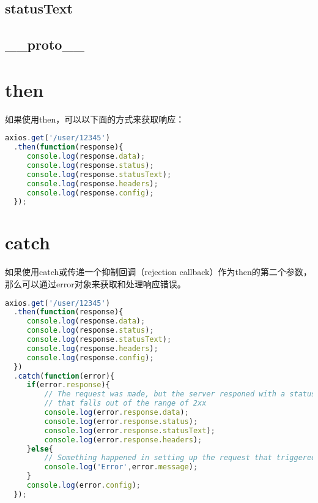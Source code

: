 \subsection{statusText}


\subsection{\_\_proto\_\_}











\section{then}

如果使用then，可以以下面的方式来获取响应：

\begin{lstlisting}[language=JavaScript]
axios.get('/user/12345')
  .then(function(response){
     console.log(response.data);
     console.log(response.status);
     console.log(response.statusText);
     console.log(response.headers);
     console.log(response.config);
  });
\end{lstlisting}




\section{catch}

如果使用catch或传递一个抑制回调（rejection callback）作为then的第二个参数，那么可以通过error对象来获取和处理响应错误。

\begin{lstlisting}[language=JavaScript]
axios.get('/user/12345')
  .then(function(response){
     console.log(response.data);
     console.log(response.status);
     console.log(response.statusText);
     console.log(response.headers);
     console.log(response.config);
  })
  .catch(function(error){
     if(error.response){
         // The request was made, but the server responed with a status code
         // that falls out of the range of 2xx
         console.log(error.response.data);
         console.log(error.response.status);
         console.log(error.response.statusText);
         console.log(error.response.headers);
     }else{
         // Something happened in setting up the request that triggered an error
         console.log('Error',error.message);
     }
     console.log(error.config);
  });
\end{lstlisting}


